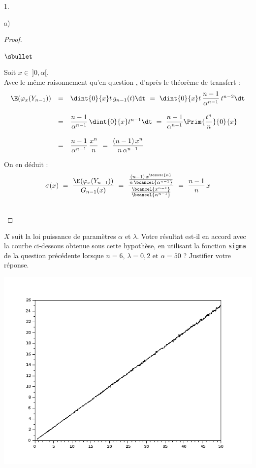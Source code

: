 \begin{noliste}{1.}
\begin{noliste}{a)}
\begin{proof}
\begin{noliste}{$\sbullet$}
	\item Soit $x \in \ ]0, \alpha[$.\\
	Avec le même raisonnement qu'en question , d'après 
	le théorème de transfert :
	\[
	  \begin{array}{rcl}
	    \E(\varphi_x(Y_{n-1})) & = & \dint{0}{x} t \, g_{n-1}(t) \dt
	    \ = \ \dint{0}{x} t \, \dfrac{n-1}{\alpha^{n-1}} \,
	    t^{n-2} \dt
	    \\[.6cm]
	    & = & \dfrac{n-1}{\alpha^{n-1}} \, \dint{0}{x} t^{n-1} \dt
	    \ = \ \dfrac{n-1}{\alpha^{n-1}} \Prim{\dfrac{t^n}{n}}
	    {0}{x}
	    \\[.6cm]
	    & = & \dfrac{n-1}{\alpha^{n-1}} \, \dfrac{x^n}{n}
	    \ = \ \dfrac{(n-1) \, x^n}{n \, \alpha^{n-1}}
	  \end{array}
	\]
	
	\item On en déduit : 
	\[
	  \sigma(x) \ = \ \dfrac{\E(\varphi_x(Y_{n-1}))}
	  {G_{n-1}(x)} \ = \ \dfrac{\frac{(n-1) \, x^{\bcancel{n}}}
	  {n \, \bcancel{\alpha^{n-1}}}}{\frac{\bcancel{x^{n-1}}}
	  {\bcancel{\alpha^{n-1}}}}
	  \ = \ \dfrac{n-1}{n} \,x
	\]
      \end{noliste}
      \conc{$\forall x \in \ ]0,\alpha[$, $\sigma(x) = \dfrac{n-1}{n}
      \, x$}~\\[-1cm]
    \end{proof}

    
    \item $X$ suit la loi puissance de paramètres $\alpha$ et $\lambda$.
    Votre résultat est-il en accord avec la courbe ci-dessous 
    obtenue sous cette hypothèse, en utilisant la fonction {\tt sigma}
    de la question précédente lorsque $n=6$, $\lambda=0,2$ et 
    $\alpha = 50$ ? Justifier votre réponse.
    
    \begin{center}
      \includegraphics[scale=.5]
      {Figures/ESSEC-I_2018/Figure_ESSEC-I_2018.png}
    \end{center}
    

\end{noliste}
\end{noliste}
